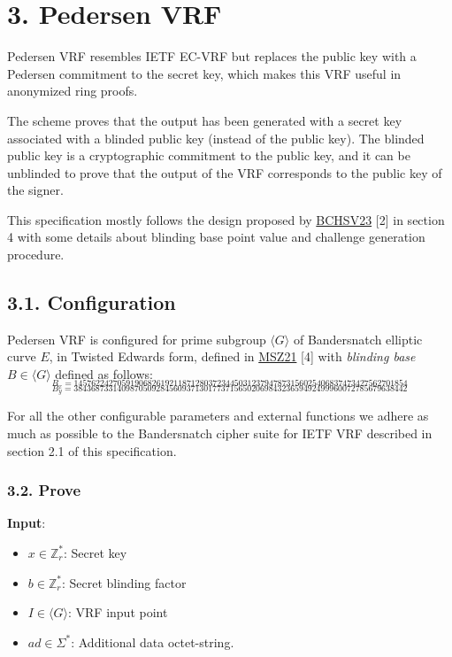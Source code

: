 \documentclass[
]{article}
\providecommand{\tightlist}{%
  \setlength{\itemsep}{0pt}\setlength{\parskip}{0pt}}
\begin{document}
\hypertarget{pedersen-vrf}{%
\section{3. Pedersen VRF}\label{pedersen-vrf}}

Pedersen VRF resembles IETF EC-VRF but replaces the public key with a
Pedersen commitment to the secret key, which makes this VRF useful in
anonymized ring proofs.

The scheme proves that the output has been generated with a secret key
associated with a blinded public key (instead of the public key). The
blinded public key is a cryptographic commitment to the public key, and
it can be unblinded to prove that the output of the VRF corresponds to
the public key of the signer.

This specification mostly follows the design proposed by
\href{https://eprint.iacr.org/2023/002}{BCHSV23} {[}2{]} in section 4
with some details about blinding base point value and challenge
generation procedure.

\hypertarget{configuration-1}{%
\subsection{3.1. Configuration}\label{configuration-1}}

Pedersen VRF is configured for prime subgroup \(\langle G \rangle\) of
Bandersnatch elliptic curve \(E\), in Twisted Edwards form, defined in
\href{https://eprint.iacr.org/2021/1152}{MSZ21} {[}4{]} with
\emph{blinding base} \(B \in \langle G \rangle\) defined as follows:
\[_{B_x = 14576224270591906826192118712803723445031237947873156025406837473427562701854}\]
\[_{B_y = 38436873314098705092845609371301773715650206984323659492499960072785679638442}\]

For all the other configurable parameters and external functions we
adhere as much as possible to the Bandersnatch cipher suite for IETF VRF
described in section 2.1 of this specification.

\hypertarget{prove-1}{%
\subsubsection{3.2. Prove}\label{prove-1}}

\textbf{Input}:

\begin{itemize}
\tightlist
\item
  \(x \in \mathbb{Z}^*_r\): Secret key
\item
  \(b \in \mathbb{Z}^*_r\): Secret blinding factor
\item
  \(I \in \langle G \rangle\): VRF input point
\item
  \(ad \in \Sigma^*\): Additional data octet-string.
\end{itemize}
\end{document}
